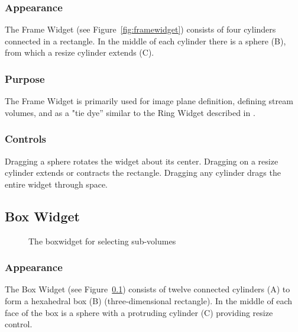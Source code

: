 \subsubsection{Appearance} The
Frame Widget (see Figure~\ref{fig:framewidget}) consists of four cylinders connected in a rectangle.  In
the middle of each cylinder there is a sphere (B), from which
a resize cylinder extends (C).

\subsubsection{Purpose} The Frame Widget is primarily used for image
plane definition, defining stream volumes, and as a "tie dye'' similar to
the Ring Widget described in .

\subsubsection{Controls} Dragging a sphere rotates the widget about its center. Dragging on a resize cylinder extends or contracts the rectangle.
Dragging any cylinder drags the entire widget through space.


\subsection{Box Widget}
\label{sec:view-boxwidget} 

\begin{figure}[htb]
  \begin{makeimage}
  \end{makeimage}
  \boxwidget
  \caption{\label{fig:boxwidget} The boxwidget for selecting sub-volumes}
\end{figure}

\subsubsection{Appearance} The Box
Widget (see Figure~\ref{sec:view-boxwidget}) consists of twelve 
connected cylinders (A) to form a hexahedral box (B) (three-dimensional
rectangle).  In the middle of each face of the box is a sphere with a protruding cylinder (C) providing resize control.

